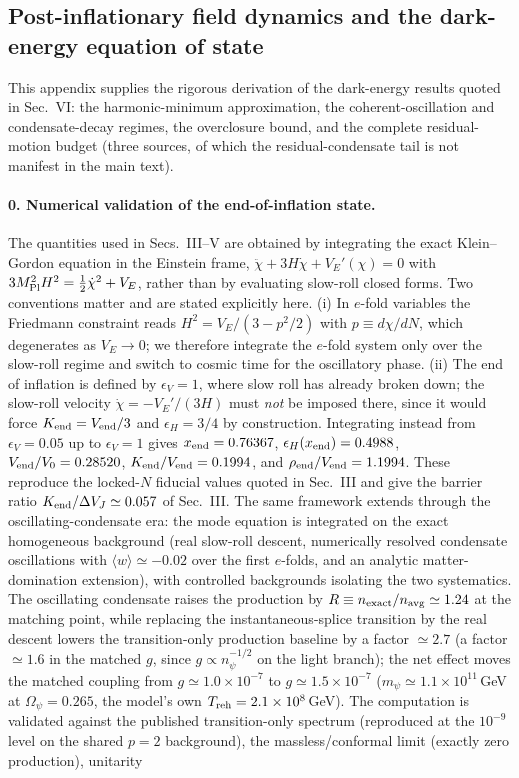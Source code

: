 \documentclass[pdflatex,sn-mathphys-num]{sn-jnl}
\newcommand{\MP}{M_{\rm Pl}}
\theoremstyle{thmstyleone}
\begin{document}
\begin{appendices}
\section{Post-inflationary field dynamics and the dark-energy equation of state}

This appendix supplies the rigorous derivation of the dark-energy results quoted in Sec.~VI: the harmonic-minimum approximation, the coherent-oscillation and condensate-decay regimes, the overclosure bound, and the complete residual-motion budget (three sources, of which the residual-condensate tail is not manifest in the main text).

\paragraph{0. Numerical validation of the end-of-inflation state.} The quantities used in Secs.~III--V are obtained by integrating the exact Klein--Gordon equation in the Einstein frame, $\ddot\chi+3H\dot\chi+V_E'(\chi)=0$ with $3\MP^2H^2=\frac12\dot\chi^2+V_E$, rather than by evaluating slow-roll closed forms. Two conventions matter and are stated explicitly here. (i) In $e$-fold variables the Friedmann constraint reads $H^2=V_E/(3-p^2/2)$ with $p\equiv d\chi/dN$, which degenerates as $V_E\to0$; we therefore integrate the $e$-fold system only over the slow-roll regime and switch to cosmic time for the oscillatory phase. (ii) The end of inflation is defined by $\epsilon_V=1$, where slow roll has already broken down; the slow-roll velocity $\dot\chi=-V_E'/(3H)$ must \emph{not} be imposed there, since it would force $K_{\rm end}=V_{\rm end}/3$ and $\epsilon_H=3/4$ by construction. Integrating instead from $\epsilon_V=0.05$ up to $\epsilon_V=1$ gives $x_{\rm end}=0.76367$, $\epsilon_H(x_{\rm end})=0.4988$, $V_{\rm end}/V_0=0.28520$, $K_{\rm end}/V_{\rm end}=0.1994$, and $\rho_{\rm end}/V_{\rm end}=1.1994$. These reproduce the locked-$N$ fiducial values quoted in Sec.~III and give the barrier ratio $K_{\rm end}/\Delta V_J\simeq0.057$ of Sec.~III. The same framework extends through the oscillating-condensate era: the mode equation is integrated on the exact homogeneous background (real slow-roll descent, numerically resolved condensate oscillations with $\langle w\rangle\simeq-0.02$ over the first $e$-folds, and an analytic matter-domination extension), with controlled backgrounds isolating the two systematics. The oscillating condensate raises the production by $R\equiv n_{\rm exact}/n_{\rm avg}\simeq1.24$ at the matching point, while replacing the instantaneous-splice transition by the real descent lowers the transition-only production baseline by a factor $\simeq2.7$ (a factor $\simeq1.6$ in the matched $g$, since $g\propto n_\psi^{-1/2}$ on the light branch); the net effect moves the matched coupling from $g\simeq1.0\times10^{-7}$ to $g\simeq1.5\times10^{-7}$ ($m_\psi\simeq1.1\times10^{11}\,$GeV at $\Omega_\psi=0.265$, the model's own $T_{\rm reh}=2.1\times10^{8}\,$GeV). The computation is validated against the published transition-only spectrum (reproduced at the $10^{-9}$ level on the shared $p=2$ background), the massless/conformal limit (exactly zero production), unitarity 
\end{appendices}
\end{document}
